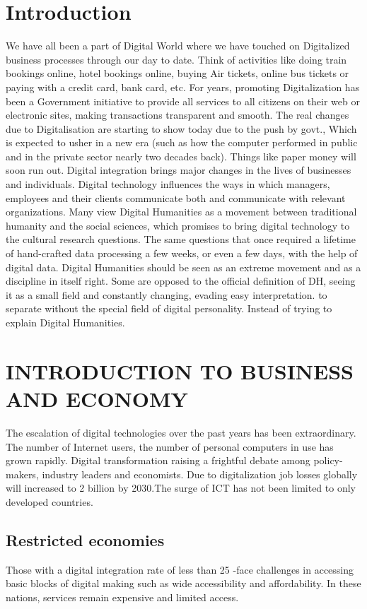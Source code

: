 \documentclass{article}
\begin{document}
\section{Introduction}
We have all been a part of Digital World where we have touched on Digitalized business processes through our day to date.
Think of activities like doing train bookings online, hotel bookings online, buying Air tickets, online bus tickets or paying with a
credit card, bank card, etc. For years, promoting Digitalization has been a Government initiative to provide all services to all citizens
on their web or electronic sites, making transactions transparent and smooth. The real changes due to Digitalisation are starting to
show today due to the push by govt., Which is expected to usher in a new era (such as how the computer performed in public and
in the private sector nearly two decades back). Things like paper money will soon run out. Digital integration brings major changes
in the lives of businesses and individuals. Digital technology influences the ways in which managers, employees and their clients
communicate both and communicate with relevant organizations. Many view Digital Humanities as a movement between traditional
humanity and the social sciences, which promises to bring digital technology to the cultural research questions. The same questions
that once required a lifetime of hand-crafted data processing a few weeks, or even a few days, with the help of digital data. Digital
Humanities should be seen as an extreme movement and as a discipline in itself right. Some are opposed to the official definition
of DH, seeing it as a small field and constantly changing, evading easy interpretation. to separate without the special field of
digital personality. Instead of trying to explain Digital Humanities.
\section {INTRODUCTION TO BUSINESS AND ECONOMY}
The escalation of digital technologies over the past years has been extraordinary. The number of Internet users, the number
of personal computers in use has grown rapidly. Digital transformation raising a frightful debate among policy-makers, industry
leaders and economists. Due to digitalization job losses globally will increased to 2 billion by 2030.The surge of ICT has not been
limited to only developed countries.
\subsection{Restricted economies}
Those with a digital integration rate of less than 25 -face challenges in accessing basic blocks of digital making such as wide
accessibility and affordability. In these nations, services remain expensive and limited access.
\end{document}
